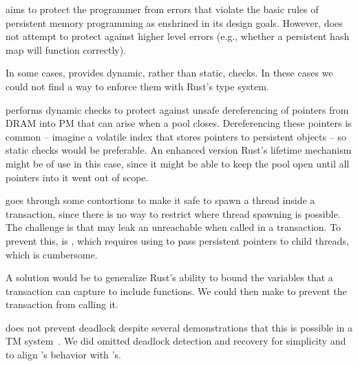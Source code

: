  \This{} aims to protect the programmer from
errors that violate the basic rules of persistent memory programming as
enshrined in its design goals.  However, \this{} does not attempt to protect
against higher level errors (e.g., whether a persistent hash map will function
correctly).

 In some cases, \this{} provides dynamic, rather than static, checks.
In these cases we could not find a way to enforce them with Rust's
type system.

\This{} performs dynamic checks to protect
against unsafe dereferencing of  pointers from DRAM into PM that can arise when a pool
closes.  Dereferencing these pointers is common -- imagine a volatile index
that stores pointers to persistent objects -- so static checks would be
preferable.  An enhanced version Rust's lifetime mechanism might be of use in
this case, since it might be able to keep the pool open until all pointers into
it went out of scope.


\This{} goes through some contortions to make it safe to spawn a thread inside a
transaction, since there is no way to restrict where thread spawning is
possible.  The challenge is that  may leak an unreachable  when called in a transaction.  To prevent this,  is , which requires using  to pass persistent pointers to child threads, which is cumbersome.

A solution would be to generalize Rust's ability to bound the variables that a
transaction can capture to include functions.  We could then
make   to prevent the transaction from
calling it.

 \This{} does not prevent deadlock despite several
demonstrations that this is possible in a TM
system~\cite{convoider,grace,tm2c,stmlock}.  We did omitted deadlock detection and
recovery for simplicity and to align 's behavior with 's.
  
